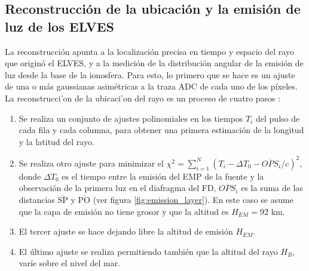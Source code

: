 \documentclass[12pt,oneside,openany,letter]{book}
\begin{document}
\subsection{Reconstrucci\'on de la ubicaci\'on y la emisi\'on de luz de los ELVES }
La reconstrucción apunta a la localización precisa en tiempo y espacio del rayo que origin\'o el ELVES, y a la medición de la distribución angular de la emisión de luz desde la base de la ionosfera. Para esto, lo primero que se hace es un ajuste de una o m\'as gaussianas asim\'etricas a la traza ADC de cada uno de los píxeles. La reconstrucci'on de la ubicaci'on del rayo es un proceso de cuatro pasos \cite{Mussa2019}:
\begin{enumerate}
    \item Se realiza un conjunto de ajustes polinomiales en los tiempos $T_i$ del pulso de cada fila y cada columna, para obtener una primera estimaci\'on de la longitud y la latitud del rayo. 
    
    \item Se realiza otro ajuste para minimizar el $\chi ^{2}= \sum_{i=1}^{N} \left( T_i -\Delta T_0 -\overline{OPS}_i/c \right)^{2}$, donde $\Delta T_0$ es el tiempo entre la emisión del EMP de la fuente y la observación de la primera luz en el diafragma del FD, $\overline{OPS}_i$ es la suma de las distancias $\overline{\text{SP}}$ y $\overline{\text{PO}}$ (ver figura \ref{fig:emission_layer}). En este caso se asume que la capa de emisión no tiene grosor y que la altitud es $H_{EM}=92$ km.
    
    \item El tercer ajuste se hace dejando libre la altitud de emisión $H_{EM}$.
    
    \item El último ajuste se realiza permitiendo también que la altitud del rayo $H_B$, varíe sobre el nivel del mar.
\end{enumerate}
\end{document}
